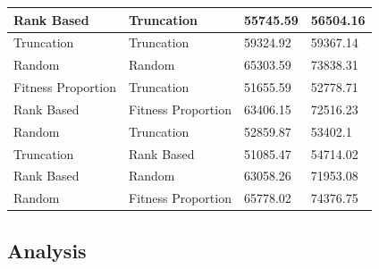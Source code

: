\documentclass[11pt, letterpaper]{article}
\begin{document}
\begin{table}[H]
\begin{tabular}{|l|l|l|l|}
        Rank Based & Truncation & 55745.59 & 56504.16 \\ \hline
        Truncation & Truncation & 59324.92 & 59367.14 \\ \hline
        Random & Random & 65303.59 & 73838.31 \\ \hline
        Fitness Proportion & Truncation & 51655.59 & 52778.71 \\ \hline
        Rank Based & Fitness Proportion & 63406.15 & 72516.23 \\ \hline
        Random & Truncation & 52859.87 & 53402.1 \\ \hline
        Truncation & Rank Based & 51085.47 & 54714.02 \\ \hline
        Rank Based & Random & 63058.26 & 71953.08 \\ \hline
        Random & Fitness Proportion & 65778.02 & 74376.75 \\ \hline
    \end{tabular}
\end{table}

\newpage
\subsection {Analysis}

\end{document}

